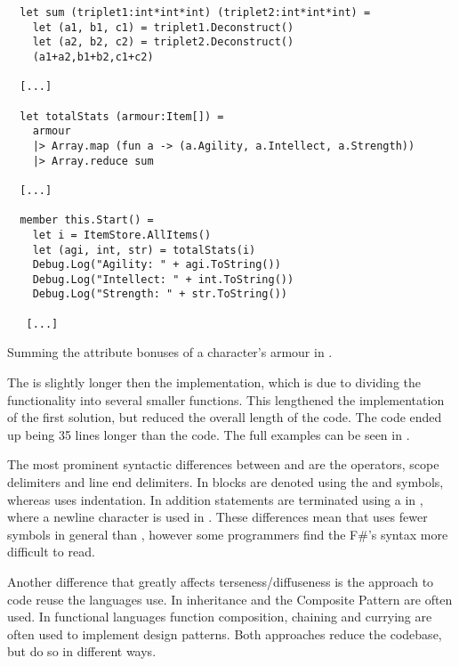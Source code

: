\begin{listing}[H]
  \begin{verbatim}
  let sum (triplet1:int*int*int) (triplet2:int*int*int) =
    let (a1, b1, c1) = triplet1.Deconstruct()
    let (a2, b2, c2) = triplet2.Deconstruct()
    (a1+a2,b1+b2,c1+c2)
  
  [...]
  
  let totalStats (armour:Item[]) =
    armour
    |> Array.map (fun a -> (a.Agility, a.Intellect, a.Strength))
    |> Array.reduce sum
  
  [...]
  
  member this.Start() =
    let i = ItemStore.AllItems()
    let (agi, int, str) = totalStats(i)
    Debug.Log("Agility: " + agi.ToString())
    Debug.Log("Intellect: " + int.ToString())
    Debug.Log("Strength: " + str.ToString())
  
   [...]
  \end{verbatim}
  \caption{Summing the attribute bonuses of a character's armour in \fs.}
  \label{lst:fs-armour}
  \end{listing}

The \fs is slightly longer then the \cs implementation, which is due to dividing the functionality into several smaller functions. This lengthened the implementation of the first solution, but reduced the overall length of the code. The \cs code ended up being 35 lines longer than the \fs code. The full examples can be seen in .

The most prominent syntactic differences between \cs and \fs are the operators, scope delimiters and line end delimiters. In \cs blocks are denoted using the \m{\{} and \m{\}} symbols, whereas \fs uses indentation. In addition statements are terminated using a \m{;} in \cs, where a newline character is used in \fs. These differences mean that \fs uses fewer symbols in general than \cs, however some programmers find the F\#'s syntax more difficult to read\cite{fsharp:light:love}.

Another difference that greatly affects terseness/diffuseness is the approach to code reuse the languages use. In \cs inheritance and the Composite Pattern\cite{composite:pattern} are often used\cite{csharp:composite:pattern}. In functional languages function composition, chaining and currying are often used to implement design patterns\cite{functional:design:patterns}. Both approaches reduce the codebase, but do so in different ways.
